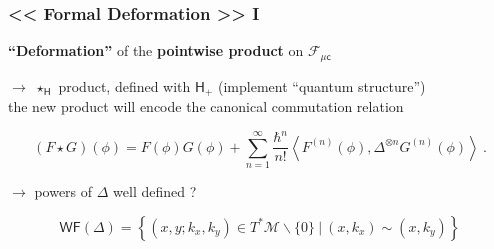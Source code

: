 \documentclass[9pt]{beamer}
\newcommand{\Smearip}[1]{\left\langle #1 \right\rangle} %
\newcommand{\Fcal}{\mathcal{F}}
\newcommand{\Hsf}{\mathsf{H}}
\newcommand{\csf}{\mathsf{c}}
\begin{document}
\begin{frame}

\frametitle{<< Formal Deformation >> I}

\textbf{``Deformation''} of the \textbf{pointwise product} on $\Fcal_{\mu\csf}$

\vfill

$\to$ $\star_\Hsf$ product, defined with $\Hsf_+$ (implement ``quantum structure'') \\[2pt]

the new product will encode the canonical commutation relation

\vfill

\begin{block}{\vspace*{-3ex}}
\begin{equation*}
 (F \star G)(\phi) = F(\phi) G(\phi) + \sum_{n=1}^\infty \frac{\hbar^n}{n!} \Smearip{F^{(n)}(\phi), \Delta^{\otimes n} G^{(n)}(\phi)} \ .
\end{equation*}
\end{block}

\vfill

$\to$ powers of $\Delta$ well defined ? 

\vfill

\begin{equation*}
\mathsf{WF}(\Delta) = \left\{ (x,y;k_x,k_y) \in T^\ast \mathcal{M} \backslash \{0\} \ | \ (x,k_x) \sim (x,k_y) \right\} 
\end{equation*}

\vfill

\end{frame}  

\end{document}
